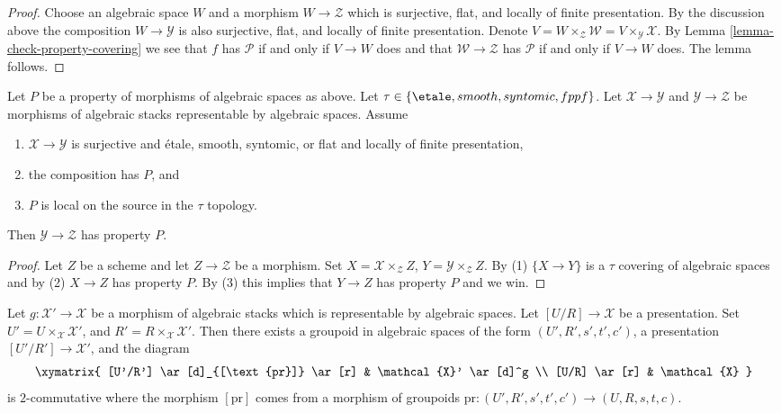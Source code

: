 \begin{proof}
Choose an algebraic space $W$ and a morphism
$W \to \mathcal{Z}$ which is surjective, flat, and locally of finite
presentation. By the discussion above the composition
$W \to \mathcal{Y}$ is also surjective, flat, and locally of finite
presentation. Denote
$V = W \times_\mathcal{Z} \mathcal{W} = V \times_\mathcal{Y} \mathcal{X}$.
By
Lemma \ref{lemma-check-property-covering}
we see that $f$ has $\mathcal{P}$ if and only if $V \to W$ does
and that $\mathcal{W} \to \mathcal{Z}$ has $\mathcal{P}$ if and only
if $V \to W$ does. The lemma follows.
\end{proof}

\begin{lemma}
\label{lemma-check-property-after-precomposing}
Let $P$ be a property of morphisms of algebraic spaces as above.
Let $\tau \in \{\etale, smooth, syntomic, fppf\}$.
Let $\mathcal{X} \to \mathcal{Y}$ and $\mathcal{Y} \to \mathcal{Z}$
be morphisms of algebraic stacks representable by algebraic spaces.
Assume
\begin{enumerate}
\item $\mathcal{X} \to \mathcal{Y}$ is surjective and
\'etale, smooth, syntomic, or flat and locally of finite presentation,
\item the composition has $P$, and
\item $P$ is local on the source in the $\tau$ topology.
\end{enumerate}
Then $\mathcal{Y} \to \mathcal{Z}$ has property $P$.
\end{lemma}

\begin{proof}
Let $Z$ be a scheme and let $Z \to \mathcal{Z}$ be a morphism.
Set $X = \mathcal{X} \times_\mathcal{Z} Z$,
$Y = \mathcal{Y} \times_\mathcal{Z} Z$. By (1) $\{X \to Y\}$
is a $\tau$ covering of algebraic spaces and by (2) $X \to Z$ has property
$P$. By (3) this implies that $Y \to Z$ has property $P$
and we win.
\end{proof}

\begin{lemma}
\label{lemma-representable-in-terms-presentations}
Let $g : \mathcal{X}' \to \mathcal{X}$ be a morphism of algebraic stacks
which is representable by algebraic spaces. Let $[U/R] \to \mathcal{X}$
be a presentation. Set $U' = U \times_\mathcal{X} \mathcal{X}'$,
and $R' = R \times_\mathcal{X} \mathcal{X}'$.
Then there exists a groupoid in algebraic spaces of the form
$(U', R', s', t', c')$, a presentation $[U'/R'] \to \mathcal{X}'$,
and the diagram
$$
\xymatrix{
[U'/R'] \ar[d]_{[\text{pr}]} \ar[r] & \mathcal{X}' \ar[d]^g \\
[U/R] \ar[r] & \mathcal{X}
}
$$
is $2$-commutative where the morphism $[\text{pr}]$ comes from a
morphism of groupoids
$\text{pr} : (U', R', s', t', c') \to (U, R, s, t, c)$.
\end{lemma}


